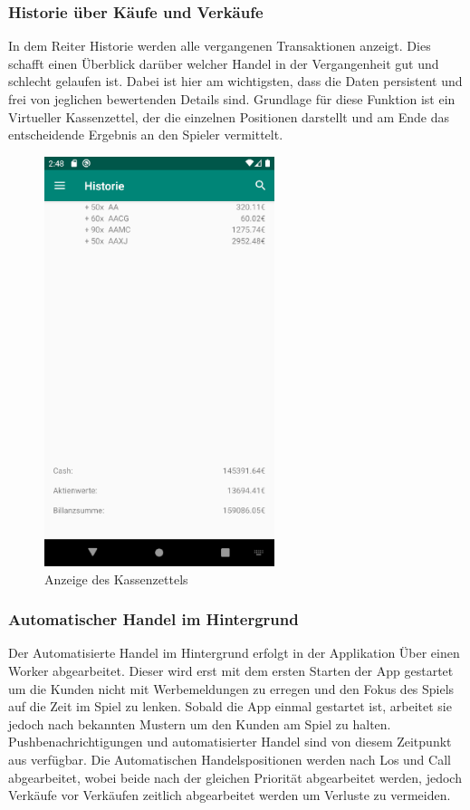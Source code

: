 \documentclass[10pt]{scrartcl}
\begin{document}
\subsubsection{Historie über Käufe und Verkäufe}

In dem Reiter Historie werden alle vergangenen Transaktionen anzeigt. Dies schafft einen Überblick darüber welcher Handel in der Vergangenheit gut und  schlecht gelaufen ist. Dabei ist hier am wichtigsten, dass die Daten persistent und frei von jeglichen bewertenden Details sind. Grundlage für diese Funktion ist ein Virtueller Kassenzettel, der die einzelnen Positionen darstellt und am Ende das entscheidende Ergebnis an den Spieler vermittelt.

\begin{figure}[H]
	\centering
	\includegraphics[width=0.6\textwidth]{Bilder/Prsi/kassenzettel.png}
	\caption{Anzeige des Kassenzettels}
\end{figure}

\subsubsection{Automatischer Handel im Hintergrund}

Der Automatisierte Handel im Hintergrund erfolgt in der Applikation Über einen Worker abgearbeitet. Dieser wird erst mit dem ersten Starten der App gestartet um die Kunden nicht mit Werbemeldungen zu erregen und den Fokus des Spiels auf die Zeit im Spiel zu lenken. Sobald die App einmal gestartet ist, arbeitet sie jedoch nach bekannten Mustern um den Kunden am Spiel zu halten. Pushbenachrichtigungen und automatisierter Handel sind von diesem Zeitpunkt aus verfügbar. Die Automatischen Handelspositionen werden nach Los und Call abgearbeitet, wobei beide nach der gleichen Priorität abgearbeitet werden, jedoch Verkäufe vor Verkäufen zeitlich abgearbeitet werden um Verluste zu vermeiden.
\end{document}
